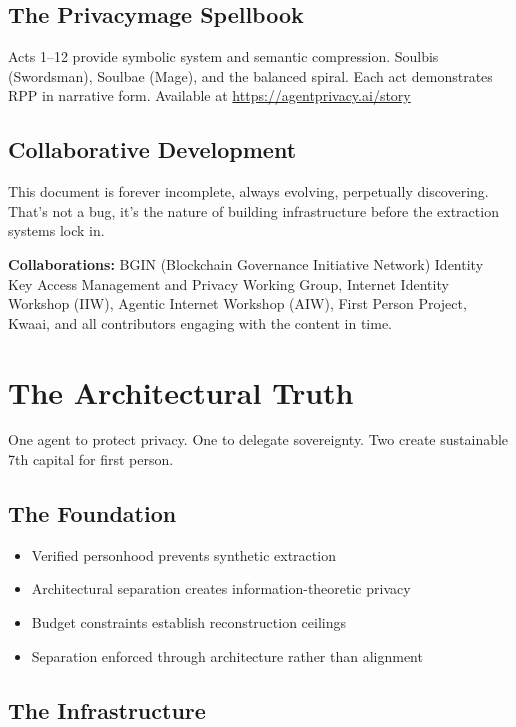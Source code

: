 \documentclass[11pt,a4paper]{article}
\theoremstyle{definition}
\begin{document}
\subsection{The Privacymage Spellbook}

Acts 1--12 provide symbolic system and semantic compression. Soulbis (Swordsman), Soulbae (Mage), and the balanced spiral. Each act demonstrates RPP in narrative form. Available at \url{https://agentprivacy.ai/story}

\subsection{Collaborative Development}

This document is forever incomplete, always evolving, perpetually discovering. That's not a bug, it's the nature of building infrastructure before the extraction systems lock in.

\textbf{Collaborations:} BGIN (Blockchain Governance Initiative Network) Identity Key Access Management and Privacy Working Group, Internet Identity Workshop (IIW), Agentic Internet Workshop (AIW), First Person Project, Kwaai, and all contributors engaging with the content in time.

\section{The Architectural Truth}

One agent to protect privacy. One to delegate sovereignty. Two create sustainable 7th capital for first person.

\subsection{The Foundation}

\begin{itemize}
    \item Verified personhood prevents synthetic extraction
    \item Architectural separation creates information-theoretic privacy
    \item Budget constraints establish reconstruction ceilings
    \item Separation enforced through architecture rather than alignment
\end{itemize}

\subsection{The Infrastructure}
\end{document}
